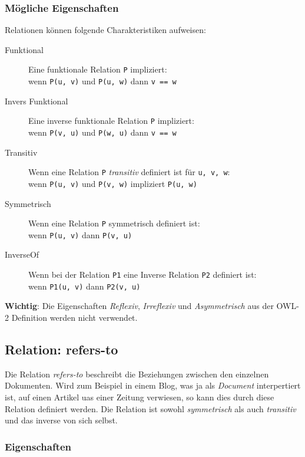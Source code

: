 \documentclass[
    11pt,
    latin1,
    a4paper,
    oneside
]{scrreprt}
\begin{document}
\subsubsection{M\"ogliche Eigenschaften} \label{sec:relations_settings}

Relationen k\"onnen folgende Charakteristiken aufweisen:

\begin{description}
  \item[Funktional] Eine funktionale Relation \texttt{P} impliziert: \\
    wenn \texttt{P(u, v)} und \texttt{P(u, w)} dann \texttt{v == w}
  \item[Invers Funktional] Eine inverse funktionale Relation \texttt{P} impliziert: \\
    wenn \texttt{P(v, u)} und \texttt{P(w, u)} dann \texttt{v == w}
  \item[Transitiv] Wenn eine Relation \texttt{P} \emph{transitiv} definiert ist f\"ur \texttt{u, v, w}: \\
    wenn \texttt{P(u, v)} und \texttt{P(v, w)} impliziert \texttt{P(u, w)}
  \item[Symmetrisch] Wenn eine Relation \texttt{P} symmetrisch definiert ist: \\
    wenn \texttt{P(u, v)} dann \texttt{P(v, u)}
  \item[InverseOf] Wenn bei der Relation \texttt{P1} eine Inverse Relation \texttt{P2} definiert ist:\\
    wenn \texttt{P1(u, v)} dann \texttt{P2(v, u)}
\end{description}

\textbf{Wichtig}: Die Eigenschaften \emph{Reflexiv}, \emph{Irreflexiv} und \emph{Asymmetrisch} aus der OWL-2 Definition werden nicht verwendet.


\subsection{Relation: refers-to} \label{sec:rel_refersto}

Die Relation \emph{refers-to} beschreibt die Beziehungen zwischen den einzelnen Dokumenten. Wird zum Beispiel in einem Blog, was ja als \emph{Document} interpertiert ist, auf einen Artikel uas einer Zeitung verwiesen, so kann dies durch diese Relation definiert werden. Die Relation ist sowohl \emph{symmetrisch} als auch \emph{transitiv} und das inverse von sich selbst.

\subsubsection{Eigenschaften} \label{sec:rel_refersto_settings}
\end{document}
